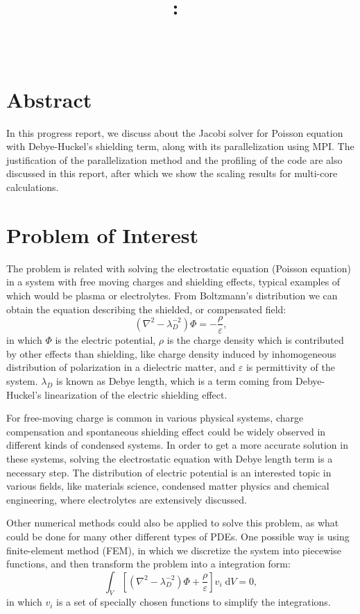 \documentclass{article}
\title{\vspace{2in}\textmd{\textbf{\hmwkClass:\ \hmwkTitle}} \\
\vspace{0.1in}\large{ \hmwkClassTime}\vspace{3in}}
\author{\textbf{\hmwkAuthorName} \\ \vspace{0.1in}
\hmwkDueDate }
\date{} %
\begin{document}
\begin{spacing}{1.1}
\maketitle

\newpage
\section*{Abstract}

In this progress report, we discuss about the Jacobi solver for Poisson equation with Debye-Huckel's shielding term, along with its parallelization using MPI. The justification of the parallelization method and the profiling of the code are also discussed in this report, after which we show the scaling results for multi-core calculations.

\section{Problem of Interest}

The problem is related with solving the electrostatic equation (Poisson equation) in a system with free moving charges and shielding effects, typical examples of which would be plasma or electrolytes. From Boltzmann's distribution we can obtain the equation describing the shielded, or compensated field:
\[(\nabla^2 - \lambda_D^{-2})\Phi=-\frac{\rho}{\varepsilon},\]
in which $\Phi$ is the electric potential, $\rho$ is the charge density which is contributed by other effects than shielding, like charge density induced by inhomogeneous distribution of polarization in a dielectric matter, and $\varepsilon$ is permittivity of the system. $\lambda_D$ is known as Debye length, which is a term coming from Debye-Huckel's linearization of the electric shielding effect.

For free-moving charge is common in various physical systems, charge compensation and spontaneous shielding effect could be widely observed in different kinds of condensed systems. In order to get a more accurate solution in these systems, solving the electrostatic equation with Debye length term is a necessary step. The distribution of electric potential is an interested topic in various fields, like materials science, condensed matter physics and chemical engineering, where electrolytes are extensively discussed.

Other numerical methods could also be applied to solve this problem, as what could be done for many other different types of PDEs. One possible way is using finite-element method (FEM), in which we discretize the system into piecewise functions, and then transform the problem into a integration form:
\[\int_V\left[(\nabla^2-\lambda_D^{-2})\Phi+\frac{\rho}{\varepsilon}\right]v_i\;\mathrm{d}V=0,\]
in which $v_i$ is a set of specially chosen functions to simplify the integrations.


\end{spacing}
\end{document}

